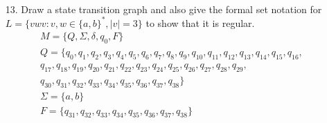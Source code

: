 \documentclass[11pt]{article} %
\begin{document}
\begin{enumerate}
\begin{eqnarray*}
\end{eqnarray*}
\item[13.] Draw a state transition graph and also give the formal set notation for \\ $L = \{vwv:v,w \in \{a,b\}^{*}, |v| = 3\}$ to show that it is regular. \\
\begin{eqnarray*}
M = \{Q, \Sigma, \delta, q_0, F\} \\ Q =\{q_0, q_1, q_2, q_3, q_4, q_5, q_6, q_7, q_8, q_9, q_{10}, q_{11}, q_{12}, q_{13}, q_{14}, q_{15}, q_{16},\\ q_{17}, q_{18}, q_{19}, q_{20}, q_{21}, q_{22}, q_{23}, q_{24}, q_{25}, q_{26}, q_{27}, q_{28}, q_{29},\\ q_{30}, q_{31}, q_{32}, q_{33}, q_{34}, q_{35}, q_{36}, q_{37}, q_{38}\} \\
\Sigma = \{a,b\} \\ F = \{q_{31}, q_{32}, q_{33}, q_{34}, q_{35}, q_{36}, q_{37}, q_{38}\} \\ 

\end{eqnarray*}
\end{enumerate}
\end{document}
